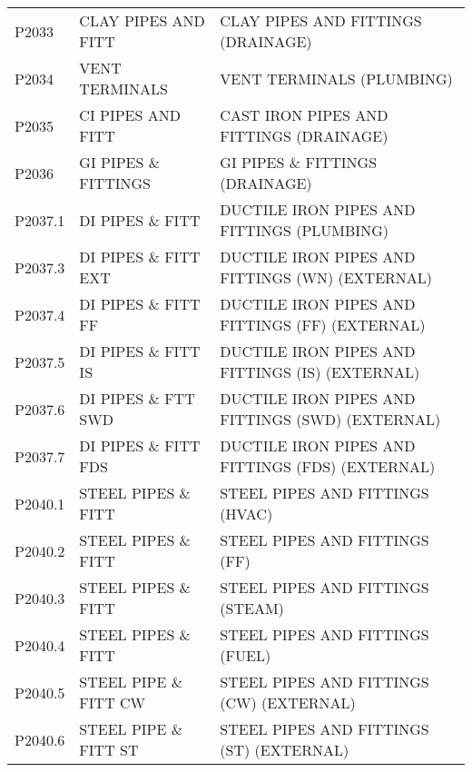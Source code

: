 \begin{longtable}[l]{l%
                  l|%
                  l|}
\rowcolor{thetableheadbgcolor!0.25!white} P2033       & CLAY PIPES AND FITT   & CLAY PIPES AND FITTINGS (DRAINAGE)   \\
\rowcolor{thetableheadbgcolor!0.25!white} P2034       & VENT TERMINALS   & VENT TERMINALS (PLUMBING)   \\
\rowcolor{thetableheadbgcolor!0.25!white} P2035       & CI PIPES AND FITT   & CAST IRON PIPES AND FITTINGS (DRAINAGE)   \\
\rowcolor{thetableheadbgcolor!0.25!white} P2036       & GI PIPES \& FITTINGS   & GI PIPES \& FITTINGS (DRAINAGE)   \\
\rowcolor{thetableheadbgcolor!0.25!white} P2037.1     & DI PIPES \& FITT   & DUCTILE IRON PIPES AND FITTINGS (PLUMBING)   \\
\rowcolor{thetableheadbgcolor!0.25!white} P2037.3     & DI PIPES \& FITT EXT   & DUCTILE IRON PIPES AND FITTINGS (WN) (EXTERNAL)   \\
\rowcolor{thetableheadbgcolor!0.25!white} P2037.4     & DI PIPES \& FITT FF   & DUCTILE IRON PIPES AND FITTINGS (FF) (EXTERNAL)   \\
\rowcolor{thetableheadbgcolor!0.25!white} P2037.5     & DI PIPES \& FITT IS   & DUCTILE IRON PIPES AND FITTINGS (IS) (EXTERNAL)   \\
\rowcolor{thetableheadbgcolor!0.25!white} P2037.6     & DI PIPES \& FTT SWD   & DUCTILE IRON PIPES AND FITTINGS (SWD) (EXTERNAL)   \\
\rowcolor{thetableheadbgcolor!0.25!white} P2037.7     & DI PIPES \& FITT FDS   & DUCTILE IRON PIPES AND FITTINGS (FDS) (EXTERNAL)   \\
\rowcolor{thetableheadbgcolor!0.25!white} P2040.1     & STEEL PIPES \& FITT   & STEEL PIPES AND FITTINGS (HVAC)   \\
\rowcolor{thetableheadbgcolor!0.25!white} P2040.2     & STEEL PIPES \& FITT   & STEEL PIPES AND FITTINGS (FF)   \\
\rowcolor{thetableheadbgcolor!0.25!white} P2040.3     & STEEL PIPES \& FITT   & STEEL PIPES AND FITTINGS  (STEAM)   \\
\rowcolor{thetableheadbgcolor!0.25!white} P2040.4     & STEEL PIPES \& FITT   & STEEL PIPES AND FITTINGS (FUEL)   \\
\rowcolor{thetableheadbgcolor!0.25!white} P2040.5     & STEEL PIPE \& FITT CW   & STEEL PIPES AND FITTINGS (CW) (EXTERNAL)   \\
\rowcolor{thetableheadbgcolor!0.25!white} P2040.6     & STEEL PIPE \& FITT ST   & STEEL PIPES AND FITTINGS  (ST) (EXTERNAL)   \\

\end{longtable}
